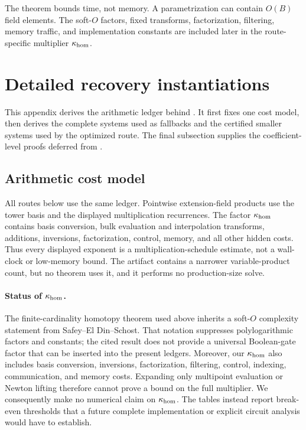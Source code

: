 \documentclass[11pt]{article}
\begin{document}
The theorem bounds time, not memory.  A parametrization can contain $O(B)$
field elements.  The soft-$O$ factors, fixed transforms, factorization,
filtering, memory traffic, and implementation constants are included later in
the route-specific multiplier $\kappa_{\rm hom}$.

\section{Detailed recovery instantiations}
\label{app:recovery-details}

This appendix derives the arithmetic ledger behind
.  It first fixes one cost model, then derives the
complete systems used as fallbacks and the certified smaller systems used by
the optimized route.  The final subsection supplies the coefficient-level
proofs deferred from .

\subsection{Arithmetic cost model}
\label{sec:sq-arithmetic}

All routes below use the same ledger.  Pointwise extension-field products use
the tower basis and the displayed multiplication recurrences.  The factor
$\kappa_{\rm hom}$ contains basis conversion, bulk evaluation and
interpolation transforms, additions, inversions, factorization, control,
memory, and all other hidden costs.  Thus every displayed exponent is a
multiplication-schedule estimate, not a wall-clock or low-memory bound.  The
artifact contains a narrower variable-product count, but no theorem uses it,
and it performs no production-size solve.

\paragraph{Status of $\kappa_{\rm hom}$.}
The finite-cardinality homotopy theorem used above inherits a soft-$O$
complexity statement from Safey--El Din--Schost.  That notation suppresses
polylogarithmic factors and constants; the cited result does not provide a
universal Boolean-gate factor that can be inserted into the present ledgers.
Moreover, our $\kappa_{\rm hom}$ also includes basis conversion, inversions,
factorization, filtering, control, indexing, communication, and memory costs.
Expanding only multipoint evaluation or Newton lifting therefore cannot prove
a bound on the full multiplier.  We consequently make no numerical claim on
$\kappa_{\rm hom}$.  The tables instead report break-even thresholds that a
future complete implementation or explicit circuit analysis would have to
establish.
\end{document}
